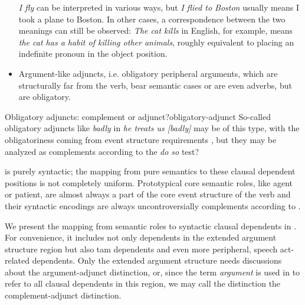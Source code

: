 \documentclass[UTF8, a4paper, oneside, scheme=plain, 12pt]{ctexbook}
\newcommand*{\term}[1]{\emph{#1}}
\newcommand{\form}[1]{\emph{#1}}
\begin{document}
\begin{table}[H]
\begin{itemize}
        \form{I fly} can be interpreted in various ways,
        but \form{I flied to Boston} usually means I took a plane to Boston.
        In other cases, a correspondence between the two meanings can still be observed:
        \form{The cat kills} in English, for example, 
        means \form{the cat has a habit of killing other animals},
        roughly equivalent to placing an indefinite pronoun in the object position.
        \item Argument-like adjuncts, i.e. obligatory peripheral arguments, 
        which are structurally far from the verb,
        bear semantic cases or are even adverbs,
        but are obligatory.
    \end{itemize}
\end{table}

\begin{todobox}{Obligatory adjuncts: complement or adjunct?}{obligatory-adjunct}
    So-called obligatory adjuncts like \form{badly} in \form{he treats us [badly]}
    may be of this type,
    with the obligatoriness coming from event structure requirements \citep{grimshaw1993obligatory},
    but they may be analyzed as complements according to the \form{do so} test?
\end{todobox}

 is purely syntactic;
the mapping from pure semantics to these clausal dependent positions is not completely uniform.
Prototypical core semantic roles, like agent or patient,
are almost always a part of the core event structure of the verb
and their syntactic encodings are always uncontroversially complements 
according to .

We present the mapping from semantic roles to syntactic clausal dependents
in .
For convenience, it includes not only dependents in the extended argument structure region
but also \ac{tam} dependents and even more peripheral, speech act-related dependents.
Only the extended argument structure needs discussions about the argument-adjunct distinction, 
or, since the term \term{argument} is used in \citet{dixon2009basic1} to refer to 
all clausal dependents in this region, 
we may call the distinction the complement-adjunct distinction.
\end{document}
